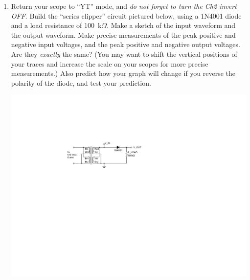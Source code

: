 \begin{enumerate}[wide]
\item Return your scope to ``YT'' mode, and \textit{do not forget to turn the Ch2 invert OFF}.  Build the ``series clipper'' circuit pictured below, using a 1N4001 diode and a load resistance of 100~k$\Omega$.  Make a sketch of the input waveform and the output waveform.  Make precise measurements of the peak positive and negative input voltages, and the peak positive and negative output voltages.  Are they \textit{exactly} the same?  (You may want to shift the vertical positions of your traces and increase the scale on your scopes for more precise measurements.)  Also predict how your graph will change if you reverse the polarity of the diode, and test your prediction. \label{part_series_clipper}
\begin{center}
\includegraphics{diodes/series_clipper.pdf}
\end{center}


\end{enumerate}
